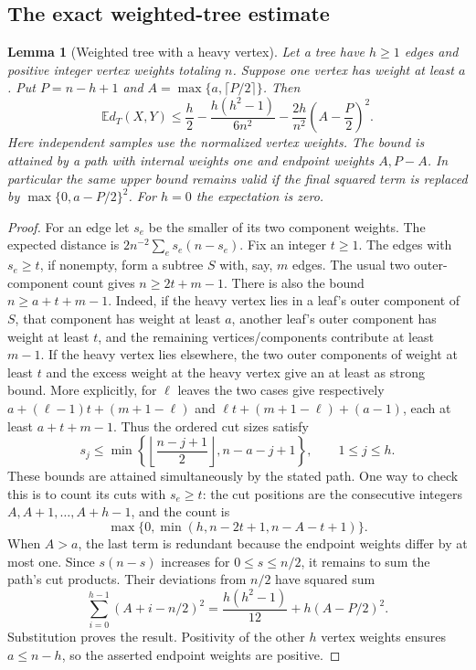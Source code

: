 \documentclass[11pt,a4paper]{article}
\newtheorem{lemma}[theorem]{Lemma}
\theoremstyle{remark}
\numberwithin{equation}{section}
\begin{document}
\subsection{The exact weighted-tree estimate}



\begin{lemma}[Weighted tree with a heavy vertex]\label{lem:ch-heavy-tree}
Let a tree have $h\ge1$ edges and positive integer vertex weights totaling
$n$. Suppose one vertex has weight at least $a$. Put $P=n-h+1$ and
$A=\max\{a,\lceil P/2\rceil\}$. Then
\[
 \mathbb E d_T(X,Y)
 \le\frac h2-\frac{h(h^2-1)}{6n^2}
       -\frac{2h}{n^2}\left(A-\frac P2\right)^2.
\]
Here independent samples use the normalized vertex weights. The bound is
attained by a path with internal weights one and endpoint weights $A,P-A$.
In particular the same upper bound remains valid if the final squared term
is replaced by $\max\{0,a-P/2\}^2$. For $h=0$ the expectation is zero.
\end{lemma}

\begin{proof}
For an edge let $s_e$ be the smaller of its two component weights. The
expected distance is $2n^{-2}\sum_e s_e(n-s_e)$. Fix an integer $t\ge1$.
The edges with $s_e\ge t$, if nonempty, form a subtree $S$ with, say,
$m$ edges. The usual two outer-component count gives $n\ge2t+m-1$.
There is also the bound $n\ge a+t+m-1$. Indeed, if the heavy vertex lies
in a leaf's outer component of $S$, that component has weight at least
$a$, another leaf's outer component has weight at least $t$, and the
remaining vertices/components contribute at least $m-1$. If the heavy
vertex lies elsewhere, the two outer components of weight at least $t$
and the excess weight at the heavy vertex give an at least as strong
bound. More explicitly, for $\ell$ leaves the two cases give respectively
$a+(\ell-1)t+(m+1-\ell)$ and
$\ell t+(m+1-\ell)+(a-1)$, each at least $a+t+m-1$.
Thus the ordered cut sizes satisfy
\[
 s_j\le\min\left\{
       \left\lfloor\frac{n-j+1}{2}\right\rfloor,
       n-a-j+1\right\},\qquad 1\le j\le h.
\]
These bounds are attained simultaneously by the stated path. One way to
check this is to count its cuts with $s_e\ge t$: the cut positions are the
consecutive integers $A,A+1,\ldots,A+h-1$, and the count is
\[
 \max\{0,\min(h,n-2t+1,n-A-t+1)\}.
\]
When $A>a$, the last term is redundant because the endpoint weights differ
by at most one. Since $s(n-s)$ increases for $0\le s\le n/2$, it remains
to sum the path's cut products. Their deviations from $n/2$ have squared
sum
\[
 \sum_{i=0}^{h-1}(A+i-n/2)^2
 =\frac{h(h^2-1)}{12}+h(A-P/2)^2.
\]
Substitution proves the result. Positivity of the other $h$ vertex weights
ensures $a\le n-h$, so the asserted endpoint weights are positive.
\end{proof}
\end{document}
